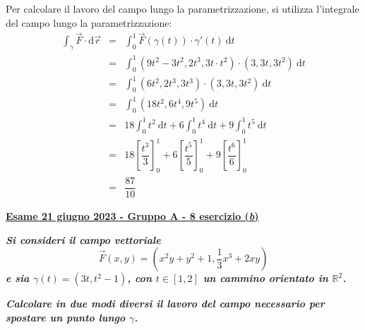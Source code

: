 \documentclass[a4paper]{article}
\newcommand{\definition}[1]{\textcolor{Red3}{\textbf{#1}}}
\newcommand{\example}[1]{\textcolor{Green4}{\textbf{#1}}}
\begin{document}
	\noindent
	Per calcolare il lavoro del campo lungo la parametrizzazione, si utilizza l'integrale del campo lungo la parametrizzazione:
	\begin{equation*}
		\begin{array}{rcl}
			\displaystyle\int_{\gamma} \overset{\rightarrow}{F} \cdot \mathrm{d}\overset{\rightarrow}{r}
			&=&
			\displaystyle\int_{0}^{1} \overset{\rightarrow}{F}\left(\gamma\left(t\right)\right) \cdot \gamma'\left(t\right) \:\mathrm{d}t \\ [1.5em]
			&=&
			\displaystyle\int_{0}^{1} \left(9t^{2}- 3t^{2}, 2t^{3}, 3t \cdot t^{2}\right) \cdot \left(3, 3t, 3t^{2}\right) \:\mathrm{d}t \\ [1.5em]
			&=&
			\displaystyle\int_{0}^{1} \left(6t^{2}, 2t^{3}, 3t^{3}\right) \cdot \left(3, 3t, 3t^{2}\right) \:\mathrm{d}t \\ [1.5em]
			&=&
			\displaystyle\int_{0}^{1} \left(18t^{2}, 6t^{4}, 9t^{5}\right) \:\mathrm{d}t \\ [1.5em]
			&=&
			18\displaystyle\int_{0}^{1} t^{2} \:\mathrm{d}t + 6\displaystyle\int_{0}^{1} t^{4} \:\mathrm{d}t + 9\displaystyle\int_{0}^{1} t^{5} \:\mathrm{d}t \\ [1.5em]
			&=&
			18\left[\dfrac{t^{3}}{3}\right]_{0}^{1} + 6\left[\dfrac{t^{5}}{5}\right]_{0}^{1} + 9\left[\dfrac{t^{6}}{6}\right]_{0}^{1} \\ [1.5em]
			&=& \dfrac{87}{10}
		\end{array}
	\end{equation*}\newpage

	\begin{flushleft}
		\label{exam: esame 21 giugno 2023 - Gruppo A - 8 esercizio (b)}
		\hypertarget{
			exam: esame 21 giugno 2023 - Gruppo A - 8 esercizio (b)
		}{
			\definition{\underline{Esame 21 giugno 2023 - Gruppo A - 8 esercizio (\emph{b})}}
		}
	\end{flushleft}
	\example{\emph{Si consideri il campo vettoriale}
	\begin{equation*}
		\overset{\rightarrow}{F}\left(x,y\right) = \left(x^{2}y+y^{2}+1, \dfrac{1}{3}x^{3}+2xy\right)
	\end{equation*}
	\emph{e sia $\gamma\left(t\right) = \left(3t, t^{2}-1\right)$, con $t \in \left[1,2\right]$ un cammino orientato in $\mathbb{R}^{2}$.}}

	\noindent
	\example{\emph{Calcolare in due modi diversi il lavoro del campo necessario per spostare un punto lungo $\gamma$.}}\newline
\end{document}
